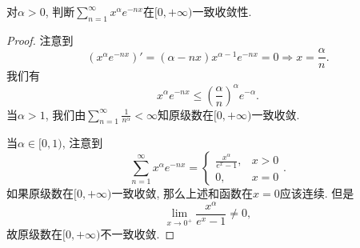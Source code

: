 \documentclass[../../main.tex]{subfiles}
\begin{document}
\begin{example}
对$\alpha>0$, 判断$\sum\limits_{n=1}^{\infty}x^\alpha e^{-nx}$在$[0,+\infty)$一致收敛性.
\end{example}
\begin{proof}
注意到
$$
\left( x^{\alpha}e^{-nx} \right) '=(\alpha -nx)x^{\alpha -1}e^{-nx}=0\Rightarrow x=\frac{\alpha}{n}.
$$
我们有
$$
x^\alpha e^{-nx}\leqslant\left(\frac{\alpha}{n}\right)^\alpha e^{-\alpha}.
$$
当$\alpha>1$, 我们由$\sum\limits_{n=1}^{\infty}\frac{1}{n^\alpha}<\infty$知原级数在$[0,+\infty)$一致收敛.

当$\alpha\in[0,1)$, 注意到
$$
\sum_{n=1}^{\infty}x^\alpha e^{-nx}=
\begin{cases}
\frac{x^\alpha}{e^x-1},&x>0\\
0,&x=0
\end{cases}.
$$
如果原级数在$[0,+\infty)$一致收敛, 那么上述和函数在$x=0$应该连续. 但是
$$
\lim_{x\to0^+}\frac{x^\alpha}{e^x-1}\neq0,
$$
故原级数在$[0,+\infty)$不一致收敛.
\end{proof}
\end{document}

